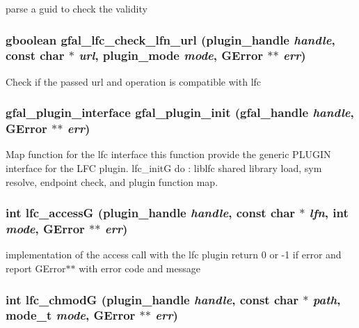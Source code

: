 parse a guid to check the validity 
\subsubsection{\setlength{\rightskip}{0pt plus 5cm}gboolean gfal\_\-lfc\_\-check\_\-lfn\_\-url (plugin\_\-handle {\em handle}, const char $\ast$ {\em url}, plugin\_\-mode {\em mode}, GError $\ast$$\ast$ {\em err})}\label{gfal__common__lfc_8c_dd0bcee4d6721102a3be26faf02d9ad8}


Check if the passed url and operation is compatible with lfc 
\subsubsection{\setlength{\rightskip}{0pt plus 5cm}\bf{gfal\_\-plugin\_\-interface} gfal\_\-plugin\_\-init (gfal\_\-handle {\em handle}, GError $\ast$$\ast$ {\em err})}\label{gfal__common__lfc_8c_0d53404e0e873535bffdfb3197bb73af}


Map function for the lfc interface this function provide the generic PLUGIN interface for the LFC plugin. lfc\_\-init\-G do : liblfc shared library load, sym resolve, endpoint check, and plugin function map. 
\subsubsection{\setlength{\rightskip}{0pt plus 5cm}int lfc\_\-access\-G (plugin\_\-handle {\em handle}, const char $\ast$ {\em lfn}, int {\em mode}, GError $\ast$$\ast$ {\em err})}\label{gfal__common__lfc_8c_3b184ab14ac0fac2931aeb7336989553}


implementation of the access call with the lfc plugin return 0 or -1 if error and report GError$\ast$$\ast$ with error code and message 
\subsubsection{\setlength{\rightskip}{0pt plus 5cm}int lfc\_\-chmod\-G (plugin\_\-handle {\em handle}, const char $\ast$ {\em path}, mode\_\-t {\em mode}, GError $\ast$$\ast$ {\em err})}\label{gfal__common__lfc_8c_e18ac164a5882443e74ba8f622186e42}



